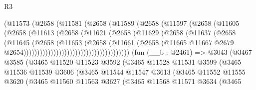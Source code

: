 \begin{lexlean}{R3}
\begin{coremodule}
                                (@11573
                                  (@2658
                                    (@11581
                                      (@2658
                                        (@11589
                                          (@2658
                                            (@11597
                                              (@2658
                                                (@11605
                                                  (@2658
                                                    (@11613
                                                      (@2658
                                                        (@11621
                                                          (@2658
                                                            (@11629
                                                              (@2658
                                                                (@11637
                                                                  (@2658
                                                                    (@11645
                                                                      (@2658
                                                                        (@11653
                                                                          (@2658
                                                                            (@11661
                                                                              (@2658
                                                                                (@11665
                                                                                  @11667
                                                                                  @2679
                                                                                  @2654)))))))))))))))))))))))))))))))))))))))
    (fun (__b : @2461) =>
    @3043
      (@3467
        @3585
        (@3465
          @11520
          @11523
          @3592
          (@3465
            @11528
            @11531
            @3599
            (@3465
              @11536
              @11539
              @3606
              (@3465
                @11544
                @11547
                @3613
                (@3465
                  @11552
                  @11555
                  @3620
                  (@3465
                    @11560
                    @11563
                    @3627
                    (@3465
                      @11568
                      @11571
                      @3634
                      (@3465

\end{coremodule}
\end{lexlean}
